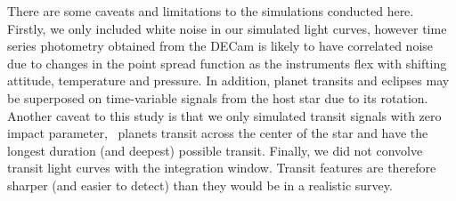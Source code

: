 


There are some caveats and limitations to the simulations conducted here.
Firstly, we only included white noise in our simulated light curves, however
time series photometry obtained from the DECam is likely to have correlated
noise due to changes in the point spread function as the instruments flex with
shifting attitude, temperature and pressure.
In addition, planet transits and eclipses may be superposed on time-variable
signals from the host star due to its rotation.
Another caveat to this study is that we only simulated transit signals with
zero impact parameter, \ie\ planets transit across the center of the star and
have the longest duration (and deepest) possible transit.
Finally, we did not convolve transit light curves with the integration window.
Transit features are therefore sharper (and easier to detect) than they would
be in a realistic survey.

